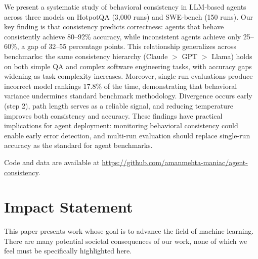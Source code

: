 \documentclass{article}
\begin{document}
We present a systematic study of behavioral consistency in LLM-based agents across three models on HotpotQA (3,000 runs) and SWE-bench (150 runs). Our key finding is that consistency predicts correctness: agents that behave consistently achieve 80--92\% accuracy, while inconsistent agents achieve only 25--60\%, a gap of 32--55 percentage points. This relationship generalizes across benchmarks: the same consistency hierarchy (Claude $>$ GPT $>$ Llama) holds on both simple QA and complex software engineering tasks, with accuracy gaps widening as task complexity increases. Moreover, single-run evaluations produce incorrect model rankings 17.8\% of the time, demonstrating that behavioral variance undermines standard benchmark methodology. Divergence occurs early (step 2), path length serves as a reliable signal, and reducing temperature improves both consistency and accuracy. These findings have practical implications for agent deployment: monitoring behavioral consistency could enable early error detection, and multi-run evaluation should replace single-run accuracy as the standard for agent benchmarks.


Code and data are available at \url{https://github.com/amanmehta-maniac/agent-consistency}.

\section*{Impact Statement}

This paper presents work whose goal is to advance the field of machine learning. There are many potential societal consequences of our work, none of which we feel must be specifically highlighted here.



\end{document}
